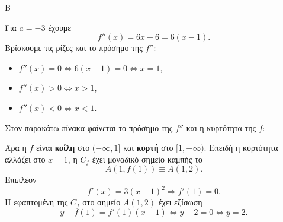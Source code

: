 \begin{thema}{Β}
\begin{erwthma}
\item Για $a=-3$ έχουμε
\[
f''(x)=6x-6=6(x-1).
\]
Βρίσκουμε τις ρίζες και το πρόσημο της $f''$:
\begin{itemize}
\item $f''(x)=0\Leftrightarrow 6(x-1)=0\Leftrightarrow x=1$,
\item $f''(x)>0\Leftrightarrow x>1$,
\item $f''(x)<0\Leftrightarrow x<1$.
\end{itemize}
Στον παρακάτω πίνακα φαίνεται το πρόσημο της $f''$ και η κυρτότητα της $f$:
\begin{center}
\end{center}
Άρα η $f$ είναι \textbf{κοίλη} στο $(-\infty,1]$ και \textbf{κυρτή} στο $[1,+\infty)$. Επειδή η κυρτότητα αλλάζει στο $x=1$, η $C_f$ έχει μοναδικό σημείο καμπής το
\[
A(1,f(1))\equiv A(1,2).
\]
Επιπλέον
\[
f'(x)=3(x-1)^2\Rightarrow f'(1)=0.
\]
Η εφαπτομένη της $C_f$ στο σημείο $A(1,2)$ έχει εξίσωση
\[
y-f(1)=f'(1)(x-1)
\Leftrightarrow y-2=0
\Leftrightarrow y=2.
\]
\end{erwthma}
\end{thema}

